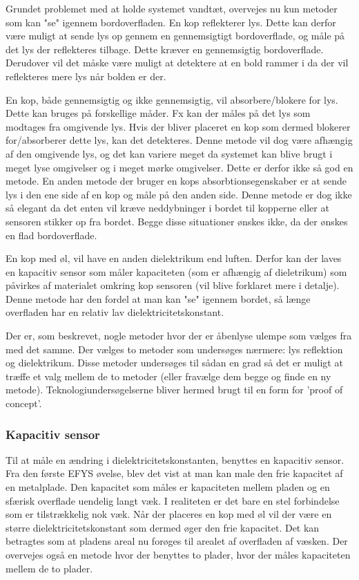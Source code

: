 \documentclass[HardwareDesign/HardwareDesign_main.tex]{subfiles}
\begin{document}
Grundet problemet med at holde systemet vandtæt, overvejes nu kun metoder som kan "se"  igennem bordoverfladen. En kop reflekterer lys. Dette kan derfor være muligt at sende lys op gennem en gennemsigtigt bordoverflade, og måle på det lys der reflekteres tilbage. Dette kræver en gennemsigtig bordoverflade. Derudover vil det måske være muligt at detektere at en bold rammer i da der vil reflekteres mere lys når bolden er der.

En kop, både gennemsigtig og ikke gennemsigtig, vil absorbere/blokere for lys. Dette kan bruges på forskellige måder. Fx kan der måles på det lys som modtages fra omgivende lys. Hvis der bliver placeret en kop som dermed blokerer for/absorberer dette lys, kan det detekteres. Denne metode vil dog være afhængig af den omgivende lys, og det kan variere meget da systemet kan blive brugt i meget lyse omgivelser og i meget mørke omgivelser. Dette er derfor ikke så god en metode. En anden metode der bruger en kops absorbtionsegenskaber er at sende lys i den ene side af en kop og måle på den anden side.  Denne metode er dog ikke så elegant da det enten vil kræve neddybninger i bordet til kopperne eller at sensoren stikker op fra bordet. Begge disse situationer ønskes ikke, da der ønskes en flad bordoverflade.

En kop med øl, vil have en anden dielektrikum end luften. Derfor kan der laves en kapacitiv sensor som måler kapaciteten (som er afhængig af dieletrikum) som påvirkes af materialet omkring kop sensoren (vil blive forklaret mere i detalje). Denne metode har den fordel at man kan "se" igennem bordet, så længe overfladen har en relativ lav dielektricitetskonstant.

Der er, som beskrevet, nogle metoder hvor der er åbenlyse ulempe som vælges fra med det samme. Der vælges to metoder som undersøges nærmere: lys reflektion og dielektrikum. Disse metoder undersøges til sådan en grad så det er muligt at træffe et valg mellem de to metoder (eller fravælge dem begge og finde en ny metode). Teknologiundersøgelserne bliver hermed brugt til en form for 'proof of concept'.  

\subsubsection{Kapacitiv sensor}
Til at måle en ændring i dielektricitetskonstanten, benyttes en kapacitiv sensor. Fra den første EFYS øvelse, blev det vist at man kan male den frie kapacitet af en metalplade. Den kapacitet som måles er kapaciteten mellem pladen og en sfærisk overflade uendelig langt væk. I realiteten er det bare en stel forbindelse som er tilstrækkelig nok væk. Når der placeres en kop med øl vil der være en større dielektricitetskonstant som dermed øger den frie kapacitet. Det kan betragtes som at pladens areal nu forøges til arealet af overfladen af væsken. Der overvejes også en metode hvor der benyttes to plader, hvor der måles kapaciteten mellem de to plader.
\end{document}
